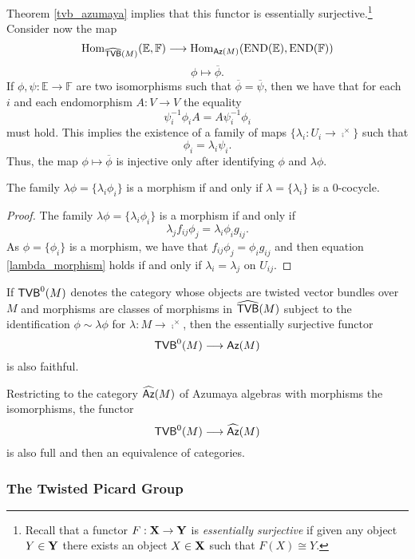 Theorem \ref{tvb_azumaya} implies that this functor is essentially surjective.\footnote{Recall that a functor $F:{\bf X}\to {\bf Y}$ is \emph{essentially surjective} if given any object $Y\in {\bf Y}$ there exists an object $X\in {\bf X}$ such that $F(X)\cong Y$.} Consider now the map
$$
\operatorname{Hom}_{\widehat{\mathsf{TVB}}(M)}(\mathbb{E},\mathbb{F})\longrightarrow \operatorname{Hom}_{\mathsf{Az}(M)}(\operatorname{END}(\mathbb{E}),\operatorname{END}(\mathbb{F}))$$
$$\phi \longmapsto \overline{\phi}.$$
If $\phi ,\psi :\mathbb{E}\to \mathbb{F}$ are two isomorphisms such that $\overline{\phi}=\overline{\psi}$, then we have that for each $i$ and each endomorphism $A:V\to V$ the equality
$$\psi_i^{-1}\phi_iA=A\psi_i^{-1}\phi_i$$
must hold. This implies the existence of a family of maps $\{\lambda_i:U_i\to \comp^{\times}\}$ such that
$$\phi_i=\lambda_i\psi_i.$$
Thus, the map $\phi\mapsto \overline{\phi}$ is injective only after identifying $\phi$ and $\lambda \phi$.

\begin{lemma}
The family $\lambda \phi=\{\lambda_i\phi_i\}$ is a morphism if and only if $\lambda=\{\lambda_i\}$ is a 0-cocycle.
\end{lemma}
\begin{proof}
The family $\lambda \phi=\{\lambda_i\phi_i\}$ is a morphism if and only if
\begin{equation}\label{lambda_morphism}
\lambda_jf_{ij}\phi_j=\lambda_i\phi_ig_{ij}.
\end{equation}
As $\phi =\{\phi_i\}$ is a morphism, we have that $f_{ij}\phi_j=\phi_ig_{ij}$ and then equation \eqref{lambda_morphism} holds if and only if $\lambda_i=\lambda_j$ on $U_{ij}$.
\end{proof}

If $\mathsf{TVB}^0(M)$ denotes the category whose objects are twisted vector bundles over $M$ and morphisms are classes of morphisms in $\widehat{\mathsf{TVB}}(M)$ subject to the identification $\phi \sim \lambda \phi$ for $\lambda :M\to \comp^{\times}$, then the essentially surjective functor
$$\mathsf{TVB}^0(M)\longrightarrow \mathsf{Az}(M)$$
is also faithful.

Restricting to the category $\widehat{\mathsf{Az}}(M)$ of Azumaya algebras with morphisms the isomorphisms, the functor
$$\mathsf{TVB}^0(M)\longrightarrow \widehat{\mathsf{Az}}(M)$$
is also full and then an equivalence of categories.


\subsubsection{The Twisted Picard Group}

